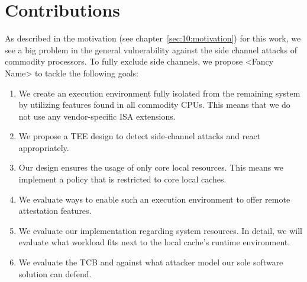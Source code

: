 \section{Contributions}
\label{sec:10:contributions}
As described in the motivation (see chapter~\ref{sec:10:motivation}) for this
work, we see a big problem in the general vulnerability against the side channel
attacks of commodity processors.
To fully exclude side channels, we propose <Fancy Name> to tackle the following goals:

\begin{enumerate}
    \item We create an execution environment fully isolated from the
          remaining system by utilizing features found in all commodity CPUs. This
          means that we do not use any vendor-specific ISA extensions.
    \item We propose a TEE design to detect side-channel attacks and react
          appropriately.
    \item Our design ensures the usage of only core local resources. This means
          we implement a policy that is restricted to core local caches.
    \item We evaluate ways to enable such an execution environment to offer
          remote attestation features.
    \item We evaluate our implementation regarding system resources. In detail,
          we will evaluate what workload fits next to the local cache's runtime environment.
    \item We evaluate the TCB and against what attacker model our sole software
          solution can defend.
\end{enumerate}
